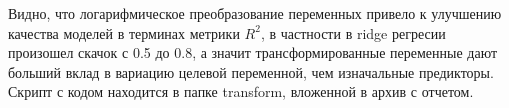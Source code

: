 \documentclass[a4paper, 12pt, oneside]{scrartcl}
\numberwithin{equation}{section}
\numberwithin{table}{section}
\numberwithin{figure}{section}
\begin{document}
Видно, что логарифмическое преобразование переменных привело к улучшению качества 
моделей в терминах метрики $ R^2 $, в частности в ridge регресии произошел скачок с 
0.5 до 0.8, а значит трансформированные переменные дают больший вклад в вариацию целевой переменной, 
чем изначальные предикторы. Скрипт с кодом находится в папке transform, вложенной в архив с отчетом.
\end{document}
